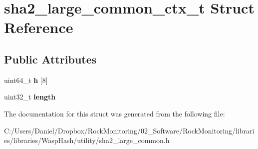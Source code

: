 \hypertarget{structsha2__large__common__ctx__t}{}\section{sha2\+\_\+large\+\_\+common\+\_\+ctx\+\_\+t Struct Reference}
\label{structsha2__large__common__ctx__t}
\subsection*{Public Attributes}
\begin{DoxyCompactItemize}
\item 
uint64\+\_\+t {\bfseries h} \mbox{[}8\mbox{]}\hypertarget{structsha2__large__common__ctx__t_a8fdccb59c8b131329e660f10777eaea7}{}\label{structsha2__large__common__ctx__t_a8fdccb59c8b131329e660f10777eaea7}

\item 
uint32\+\_\+t {\bfseries length}\hypertarget{structsha2__large__common__ctx__t_a85afcbdfc07f81767d8ea0f678e92830}{}\label{structsha2__large__common__ctx__t_a85afcbdfc07f81767d8ea0f678e92830}

\end{DoxyCompactItemize}


The documentation for this struct was generated from the following file\+:\begin{DoxyCompactItemize}
\item 
C\+:/\+Users/\+Daniel/\+Dropbox/\+Rock\+Monitoring/02\+\_\+\+Software/\+Rock\+Monitoring/libraries/libraries/\+Wasp\+Hash/utility/sha2\+\_\+large\+\_\+common.\+h\end{DoxyCompactItemize}
